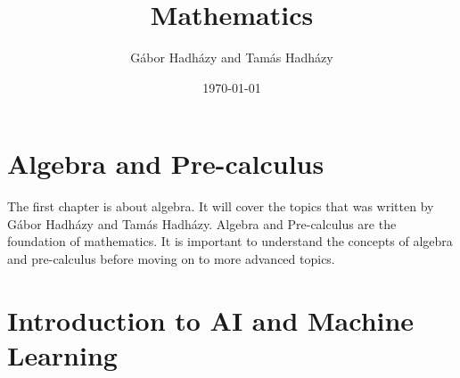 \documentclass[a4paper,12pt]{book}
\author{Gábor Hadházy and Tamás Hadházy}
\title{Mathematics}
\date{\today}
\begin{document}
\maketitle

\tableofcontents

\chapter{Algebra and Pre-calculus}
The first chapter is about algebra. It will cover the topics that was written by Gábor Hadházy and Tamás Hadházy. Algebra and Pre-calculus are the foundation of mathematics. It is important to understand the concepts of algebra and pre-calculus before moving on to more advanced topics.


\chapter{Introduction to AI and Machine Learning}
\end{document}
